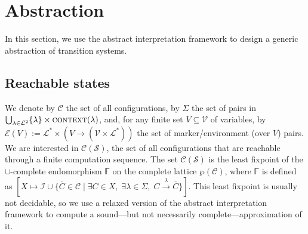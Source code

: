 \documentclass{article}
\newcommand{\bydef}{:=}
\newcommand{\Names}{\mathcal{V}}
\newcommand{\Labels}{\mathcal{L}}
\newcommand{\System}{\mathcal{S}}
\newcommand{\Markers}{\Labels^{\ast}}
\newcommand{\Env}[1]{\Markers \times (#1 \rightarrow (\Names\times\Markers))}
\newcommand{\env}[1]{\mathcal{E}(#1)}
\newcommand{\initstan}{\mathcal{I}}
\newcommand{\nonstan}[1]{\overset{\scriptscriptstyle{#1}}{\scriptstyle \longrightarrow}}
\newcommand{\states}{\mathcal{C}}
\newcommand{\Coll}{\states(\System)}
\newcommand{\translabel}{\Labels^2}
\newcommand{\extendedSigma}{\Sigma}
\begin{document}
\section{Abstraction}
\label{ai}
In this section, we use the abstract interpretation framework \cite{c:thesis,cc:popl77} to design a generic abstraction of transition systems. 

\subsection{Reachable states}
We denote  by $\states$ the set  of all configurations, by $\extendedSigma$ the set of pairs 
in $\bigcup_{\lambda\in\translabel} \{\lambda\}\times \abstractcontext(\lambda)$, and, for any finite set $V\subseteq \Names$ of variables, by $\env{V}\bydef\Env{V}$ the set of  marker/environment (over $V$) pairs.
We are interested in $\Coll$, the set  of all configurations that are reachable through a finite computation sequence.
The set $\Coll$ is the least fixpoint of the $\cup$-complete endomorphism $\mathbb{F}$ on the complete lattice $\wp(\states)$, where $\mathbb{F}$ is defined as $[X \mapsto \initstan \cup \{\overline{C}\in\states\;|\; \exists C\in
X,\;\exists \lambda\in\extendedSigma,\;C\nonstan{\lambda} \overline{C} \}]$.
This least fixpoint is usually not decidable, so 
 we use a relaxed version of the abstract interpretation framework
\cite{cc:frameworks}  to compute a sound---but not necessarily complete---approximation of it.
\end{document}
